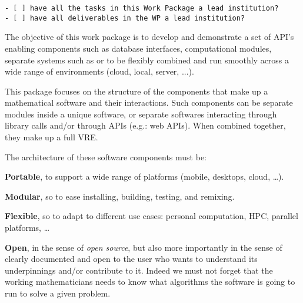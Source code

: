 \begin{draft}
\begin{verbatim}
- [ ] have all the tasks in this Work Package a lead institution?
- [ ] have all deliverables in the WP a lead institution?
\end{verbatim}
\end{draft}

\begin{workpackage}[id=component-architecture,wphases=0-48!.5,
  title=Component Architecture,lead=UV,
  PSRM=24,UVRM=8,SARM=16, USHRM=4, USORM=6]

  \begin{wpobjectives}
    The objective of this work package is to develop and demonstrate a
    set of API's enabling components such as database interfaces,
    computational modules, separate systems such as \GAP or \Sage to
    be flexibly combined and run smoothly across a wide range of
    environments (cloud, local, server, ...).
  \end{wpobjectives}

  \begin{wpdescription}
    This package focuses on the structure of the components that make
    up a mathematical software and their interactions. Such components
    can be separate modules inside a unique software, or separate
    softwares interacting through library calls and/or through APIs
    (e.g.: web APIs). When combined together, they make up a full VRE.

    The architecture of these software components must be:
    \begin{compactitem}
    \item \textbf{Portable}, to support a wide range of platforms
      (mobile, desktops, cloud, \dots).
    \item \textbf{Modular}, so to ease installing, building, testing,
      and remixing.
    \item \textbf{Flexible}, so to adapt to different use cases:
      personal computation, HPC, parallel platforms, \dots
    \item \textbf{Open}, in the sense of \emph{open source}, but also
      more importantly in the sense of clearly documented and open to
      the user who wants to understand its underpinnings and/or
      contribute to it. Indeed we must not forget that the working
      mathematicians needs to know what algorithms the software is
      going to run to solve a given problem.
    \end{compactitem}
  \end{wpdescription}


\end{workpackage}
